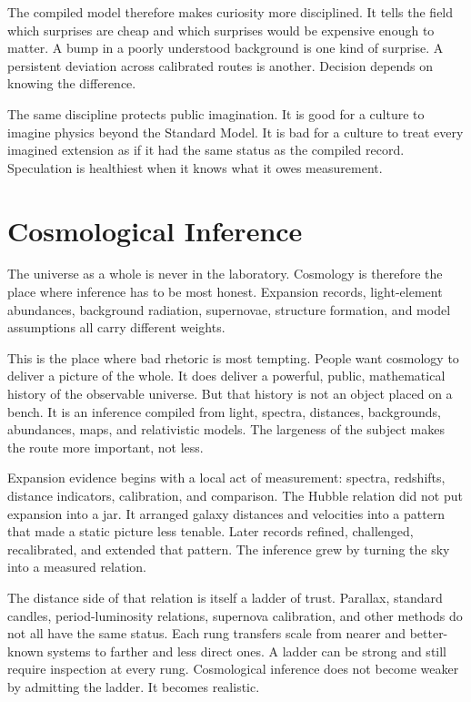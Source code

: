 The compiled model therefore makes curiosity more disciplined. It tells the
field which surprises are cheap and which surprises would be expensive enough
to matter. A bump in a poorly understood background is one kind of surprise.
A persistent deviation across calibrated routes is another. Decision depends
on knowing the difference.

The same discipline protects public imagination. It is good for a culture to
imagine physics beyond the Standard Model. It is bad for a culture to treat
every imagined extension as if it had the same status as the compiled record.
Speculation is healthiest when it knows what it owes measurement.

\section{Cosmological Inference}

The universe as a whole is never in the laboratory. Cosmology is therefore the
place where inference has to be most honest. Expansion records, light-element
abundances, background radiation, supernovae, structure formation, and model
assumptions all carry different weights.

This is the place where bad rhetoric is most tempting. People want cosmology
to deliver a picture of the whole. It does deliver a powerful, public,
mathematical history of the observable universe. But that history is not an
object placed on a bench. It is an inference compiled from light, spectra,
distances, backgrounds, abundances, maps, and relativistic models. The
largeness of the subject makes the route more important, not less.

Expansion evidence begins with a local act of measurement: spectra, redshifts,
distance indicators, calibration, and comparison. The Hubble relation did not
put expansion into a jar. It arranged galaxy distances and velocities into a
pattern that made a static picture less tenable. Later records refined,
challenged, recalibrated, and extended that pattern. The inference grew by
turning the sky into a measured relation.

The distance side of that relation is itself a ladder of trust. Parallax,
standard candles, period-luminosity relations, supernova calibration, and
other methods do not all have the same status. Each rung transfers scale from
nearer and better-known systems to farther and less direct ones. A ladder can
be strong and still require inspection at every rung. Cosmological inference
does not become weaker by admitting the ladder. It becomes realistic.

